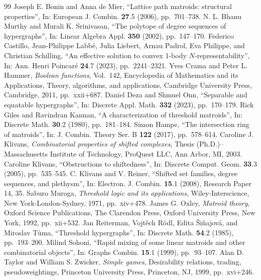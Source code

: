\documentclass[10pt,a4paper]{amsart}
\theoremstyle{definition}
\theoremstyle{plain}
\begin{document}
\begin{thebibliography}{99}
 Joseph E. Bonin and Anna de Mier, ``Lattice path matroids: structural properties'', In: European J. Combin. \textbf{27}.5 (2006), pp.~701--738.
 N. L. Bhanu Murthy and Murali K. Srinivasan, ``The polytope of degree sequences of hypergraphs'', In: Linear Algebra Appl. \textbf{350} (2002), pp.~147--170.
 Federico Castillo, Jean-Philippe Labb\'e, Julia Liebert, Arnau Padrol, Eva Philippe, and Christian Schilling, ``An effective solution to convex 1-body $N$-representability'', In: Ann. Henri Poincar\'e \textbf{24}.7 (2023), pp.~2241--2321.
 Yves Crama and Peter L. Hammer, \emph{Boolean functions}, Vol.~142, Encyclopedia of Mathematics and its Applications, Theory, algorithms, and applications, Cambridge University Press, Cambridge, 2011, pp.~xxii+687.
 Daniel Deza and Shmuel Onn, ``Separable and equatable hypergraphs'', In: Discrete Appl. Math. \textbf{332} (2023), pp.~170--179.
 Rick Giles and Ravindran Kannan, ``A characterization of threshold matroids'', In: Discrete Math. \textbf{30}.2 (1980), pp.~181--184.
 Simon Hampe, ``The intersection ring of matroids'', In: J. Combin. Theory Ser. B \textbf{122} (2017), pp.~578--614.
 Caroline J. Klivans, \emph{Combinatorial properties of shifted complexes}, Thesis (Ph.D.)--Massachusetts Institute of Technology, ProQuest LLC, Ann Arbor, MI, 2003.
 Caroline Klivans, ``Obstructions to shiftedness'', In: Discrete Comput. Geom. \textbf{33}.3 (2005), pp.~535--545.
 C. Klivans and V. Reiner, ``Shifted set families, degree sequences, and plethysm'', In: Electron. J. Combin. \textbf{15}.1 (2008), Research Paper 14, 35.
 Saburo Muroga, \emph{Threshold logic and its applications}, Wiley-Interscience, New York-London-Sydney, 1971, pp.~xiv+478.
 James G. Oxley, \emph{Matroid theory}, Oxford Science Publications, The Clarendon Press, Oxford University Press, New York, 1992, pp.~xii+532.
 Jan Reiterman, Vojt\v{e}ch R\"odl, Edita \v{S}i\v{n}ajov\'a, and Miroslav T\r{u}ma, ``Threshold hypergraphs'', In: Discrete Math. \textbf{54}.2 (1985), pp.~193--200.
 Milind Sohoni, ``Rapid mixing of some linear matroids and other combinatorial objects'', In: Graphs Combin. \textbf{15}.1 (1999), pp.~93--107.
 Alan D. Taylor and William S. Zwicker, \emph{Simple games}, Desirability relations, trading, pseudoweightings, Princeton University Press, Princeton, NJ, 1999, pp.~xvi+246.
\end{thebibliography}
\end{document}
